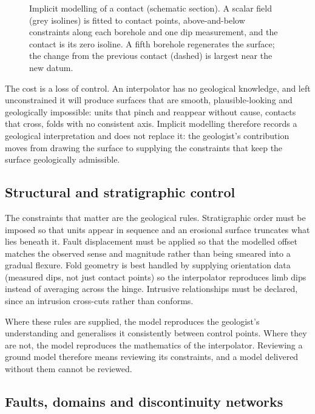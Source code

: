 \begin{figure}[htbp]
\centering
{}
\caption{Implicit modelling of a contact (schematic section). A scalar field (grey isolines) is fitted to contact points, above-and-below constraints along each borehole and one dip measurement, and the contact is its zero isoline. A fifth borehole regenerates the surface; the change from the previous contact (dashed) is largest near the new datum.}
\label{fig:implicit-scalar-field}
\end{figure}

The cost is a loss of control. An interpolator has no geological knowledge, and left
unconstrained it will produce surfaces that are smooth, plausible-looking and
geologically impossible: units that pinch and reappear without cause,
contacts that cross, folds with no consistent axis. Implicit modelling
therefore records a geological interpretation and does not replace it: the
geologist's contribution moves from drawing the surface to
supplying the constraints that keep the surface geologically admissible.

\subsection{Structural and stratigraphic control}
\label{sec:structural-control-modelling}

The constraints that matter are the geological rules. Stratigraphic order must
be imposed so that units appear in sequence and an erosional surface truncates
what lies beneath it. Fault displacement must be applied so that the modelled
offset matches the observed sense and magnitude rather than being smeared into
a gradual flexure. Fold geometry is best handled by supplying orientation data
(measured dips, not just contact points) so the interpolator reproduces
limb dips instead of averaging across the hinge. Intrusive relationships must
be declared, since an intrusion cross-cuts rather than conforms.

Where these rules are supplied, the model reproduces the geologist's
understanding and generalises it consistently between control points. Where
they are not, the model reproduces the mathematics of the interpolator.
Reviewing a ground model therefore means reviewing its constraints, and a
model delivered without them cannot be reviewed.

\subsection{Faults, domains and discontinuity networks}
\label{sec:dfn}

